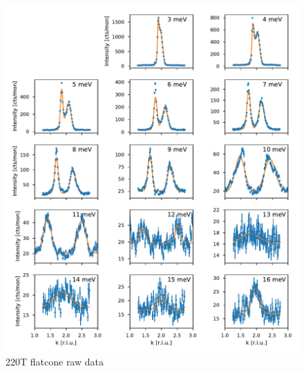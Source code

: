 \begin{figure}
    \centering
    \includegraphics[width=\textwidth]{fig/lowen/fits_220T.pdf}
    \caption[220T flatcone raw data]{220T flatcone raw data}
\end{figure}

